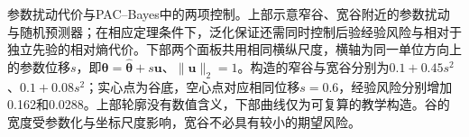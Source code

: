 参数扰动代价与PAC--Bayes中的两项控制。上部示意窄谷、宽谷附近的参数扰动与随机预测器；在相应定理条件下，泛化保证还需同时控制后验经验风险与相对于独立先验的相对熵代价。下部两个面板共用相同横纵尺度，横轴为同一单位方向上的参数位移$s$，即$\bm\theta=\hat{\bm\theta}+s\bm u$、$\|\bm u\|_2=1$。构造的窄谷与宽谷分别为$0.1+0.45s^2$、$0.1+0.08s^2$；实心点为谷底，空心点对应相同位移$s=0.6$，经验风险分别增加0.162和0.0288。上部轮廓没有数值含义，下部曲线仅为可复算的教学构造。谷的宽度受参数化与坐标尺度影响，宽谷不必具有较小的期望风险。

